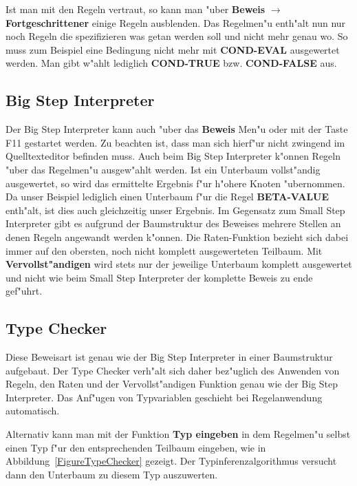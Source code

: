 Ist man mit den Regeln vertraut, so kann man "uber {\bf Beweis}
$\rightarrow$ {\bf Fortgeschrittener} einige Regeln ausblenden. Das
Regelmen"u enth"alt nun nur noch Regeln die spezifizieren was getan
werden soll und nicht mehr genau wo. So muss zum Beispiel eine
Bedingung nicht mehr mit {\bf COND-EVAL} ausgewertet werden. Man
gibt w"ahlt lediglich {\bf COND-TRUE} bzw. {\bf COND-FALSE} aus.

\subsection{Big Step Interpreter}
Der Big Step Interpreter kann auch "uber das {\bf Beweis} Men"u oder
mit der Taste F11 gestartet werden. Zu beachten ist, dass man sich
hierf"ur nicht zwingend im Quelltexteditor befinden muss. Auch beim
Big Step Interpreter k"onnen Regeln "uber das Regelmen"u ausgew"ahlt
werden. Ist ein Unterbaum vollst"andig ausgewertet, so wird das
ermittelte Ergebnis f"ur h"ohere Knoten "ubernommen. Da unser
Beispiel lediglich einen Unterbaum f"ur die Regel {\bf BETA-VALUE}
enth"alt, ist dies auch gleichzeitig unser Ergebnis. Im Gegensatz
zum Small Step Interpreter gibt es aufgrund der Baumstruktur des
Beweises mehrere Stellen an denen Regeln angewandt werden k"onnen.
Die Raten-Funktion bezieht sich dabei immer auf den obersten, noch
nicht komplett ausgewerteten Teilbaum. Mit {\bf Vervollst"andigen}
wird stets nur der jeweilige Unterbaum komplett ausgewertet und
nicht wie beim Small Step Interpreter der komplette Beweis zu ende
gef"uhrt.

\subsection{Type Checker}

Diese Beweisart ist genau wie der Big Step Interpreter in einer
Baumstruktur aufgebaut. Der Type Checker verh"alt sich daher
bez"uglich des Anwenden von Regeln, den Raten und der
Vervollst"andigen Funktion genau wie der Big Step Interpreter. Das
Anf"ugen von Typvariablen geschieht bei Regelanwendung automatisch.

Alternativ kann man mit der Funktion {\bf Typ eingeben} in dem
Regelmen"u selbst einen Typ f"ur den entsprechenden Teilbaum
eingeben, wie in Abbildung~\ref{FigureTypeChecker} gezeigt.
Der Typinferenzalgorithmus versucht dann den Unterbaum zu
diesem Typ auszuwerten.

